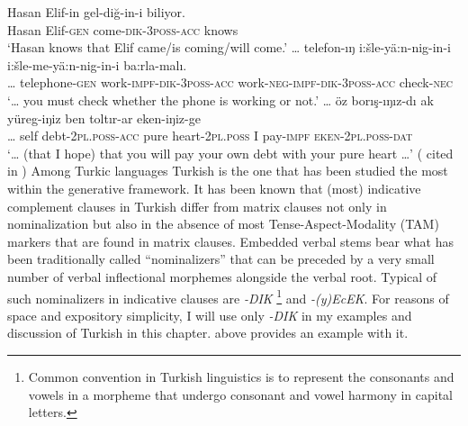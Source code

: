\documentclass[output=paper]{langsci/langscibook}
\begin{document}
\ea%
\settowidth{}
    \label{kelepirex:key:1}
    \gll Hasan Elif-in gel-diğ-in-i biliyor.\\
    Hasan Elif-\textsc{gen} come-\textsc{dik}{}-\textsc{3poss}{}-\textsc{acc} knows\\
    \glt `Hasan knows that Elif came/is coming/will come.'
\ex%
    \label{kelepirex:key:2}
    \gll \ldots{} telefon-ıŋ i:šle-yä:n-nig-in-i i:šle-me-yä:n-nig-in-i ba:rla-malı.\\
    \ldots{} telephone-\textsc{gen}  work-\textsc{impf}{}-\textsc{dik}{}-\textsc{3poss}{}-\textsc{acc} work-\textsc{neg}{}-\textsc{impf}{}-\textsc{dik}{}-\textsc{3poss}{}-\textsc{acc} check-\textsc{nec} \\
    \glt `\ldots{} you must check whether the phone is working or not.'
\ex%
    \label{kelepirex:key:3}
    \gll \ldots{} öz borış-ıŋız-dı ak yüreg-iŋiz ben toltır-ar eken-iŋiz-ge \\
    \ldots{} self debt-\textsc{2pl.poss}{}-\textsc{acc} pure heart-\textsc{2pl.poss} I pay-\textsc{impf} \textsc{eken}{}-\textsc{2pl.poss}{}-\textsc{dat} \\
    \glt `\ldots{} (that I hope) that you will pay your own debt with your pure heart \ldots{}'
            (\citealp[125]{DjanbidaevaOgurlieva1995} cited in \citealp[354]{Karakoc2007})
\z 
Among Turkic languages Turkish is the one that has been studied the most within the generative framework. 
It has been known that (most) indicative complement clauses in Turkish differ from matrix clauses not only in nominalization 
but also in the absence of most Tense-Aspect-Modality (TAM) markers that are found in matrix clauses.  
Embedded verbal stems bear what has been traditionally called ``nominalizers'' that can be preceded by a very small number 
of verbal inflectional morphemes alongside the verbal root. 
Typical of such nominalizers in indicative clauses are \textit{-DIK}%
\footnote{
    Common convention in Turkish linguistics is to represent the consonants and vowels in a morpheme 
    that undergo consonant and vowel harmony in capital letters.
}
and \textit{-(y)EcEK}. 
For reasons of space and expository simplicity, I will use only \textit{-DIK} in my examples and discussion of Turkish in this chapter. 
 above provides an example with it. 
\end{document}
